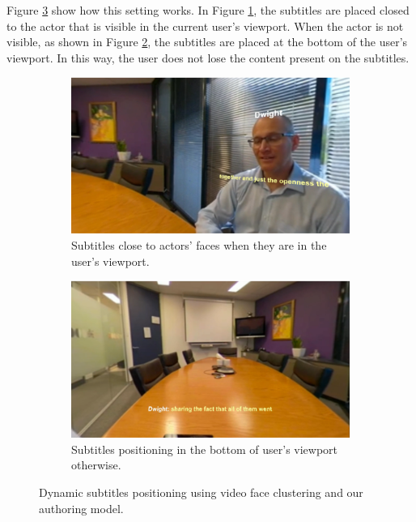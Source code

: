 Figure \ref{fig:dynamic_subtitles} show how this setting works. In Figure \ref{subfig:subtitles_actor}, the subtitles are placed closed to the actor that is visible in the current user's viewport. When the actor is not visible, as shown in Figure \ref{subfig:subtitles_bottom}, the subtitles are placed at the bottom of the user's viewport. In this way, the user does not lose the content present on the subtitles.

\begin{figure}[!ht]
\centering
    \begin{subfigure}{0.49\linewidth}
        \centering
        \includegraphics[width=1\textwidth]{img/video360/subtitles_actor.png}
        \caption{Subtitles close to actors' faces when they are in the user's viewport.}
        \label{subfig:subtitles_actor}
    \end{subfigure}\hfill
    \begin{subfigure}{0.49\linewidth}
        \centering
        \includegraphics[width=1\textwidth]{img/video360/subtitles_bottom.png}
        \caption{Subtitles positioning in the bottom of user's viewport otherwise.}
        \label{subfig:subtitles_bottom}
    \end{subfigure}

\caption{Dynamic subtitles positioning using video face clustering and our authoring model.}
\label{fig:dynamic_subtitles}
\end{figure}

